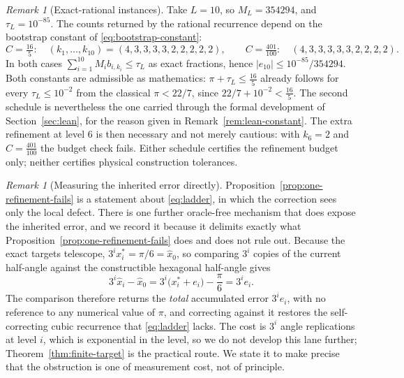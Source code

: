 \documentclass[12pt]{article}
\theoremstyle{definition}
\theoremstyle{remark}
\newtheorem{remark}[theorem]{Remark}
\newcommand{\abs}[1]{\left|#1\right|}
\begin{document}
\begin{remark}[Exact-rational instances]
\label{rem:ladder-instance}
Take $L=10$, so $M_L=354294$, and $\tau_L=10^{-85}$.  The counts returned by the
rational recurrence depend on the bootstrap constant of
\eqref{eq:bootstrap-constant}:
\[
  C=\tfrac{16}{5}:\quad(k_1,\ldots,k_{10})=(4,3,3,3,3,2,2,2,2,2),
  \qquad
  C=\tfrac{401}{100}:\quad(4,3,3,3,3,3,2,2,2,2).
\]
In both cases $\sum_{i=1}^{10}M_ib_{i,k_i}\le\tau_L$ as exact fractions, hence
$\abs{e_{10}}\le10^{-85}/354294$.  Both constants are admissible as
mathematics: $\pi+\tau_L\le\tfrac{16}{5}$ already follows for every
$\tau_L\le10^{-2}$ from the classical $\pi<22/7$, since
$22/7+10^{-2}<\tfrac{16}{5}$.  The second schedule is nevertheless the one
carried through the formal development of Section~\ref{sec:lean}, for the
reason given in Remark~\ref{rem:lean-constant}.  The extra refinement at level
$6$ is then necessary and not merely cautious: with $k_6=2$ and
$C=\tfrac{401}{100}$ the budget check fails.  Either schedule certifies the
refinement budget only; neither certifies physical construction tolerances.
\end{remark}

\begin{remark}[Measuring the inherited error directly]
\label{rem:replication}
Proposition~\ref{prop:one-refinement-fails} is a statement about
\eqref{eq:ladder}, in which the correction sees only the local defect.  There is
one further oracle-free mechanism that does expose the inherited error, and we
record it because it delimits exactly what
Proposition~\ref{prop:one-refinement-fails} does and does not rule out.  Because
the exact targets telescope, $3^ix_i^\ast=\pi/6=\widehat x_0$, so comparing
$3^i$ copies of the current half-angle against the constructible hexagonal
half-angle gives
\[
  3^i\widehat x_i-\widehat x_0
  =3^i\bigl(x_i^\ast+e_i\bigr)-\frac{\pi}{6}
  =3^ie_i.
\]
The comparison therefore returns the \emph{total} accumulated error $3^ie_i$,
with no reference to any numerical value of $\pi$, and correcting against it
restores the self-correcting cubic recurrence that \eqref{eq:ladder} lacks.  The
cost is $3^i$ angle replications at level $i$, which is exponential in the
level, so we do not develop this lane further; Theorem~\ref{thm:finite-target}
is the practical route.  We state it to make precise that the obstruction is
one of measurement cost, not of principle.
\end{remark}

\end{document}
